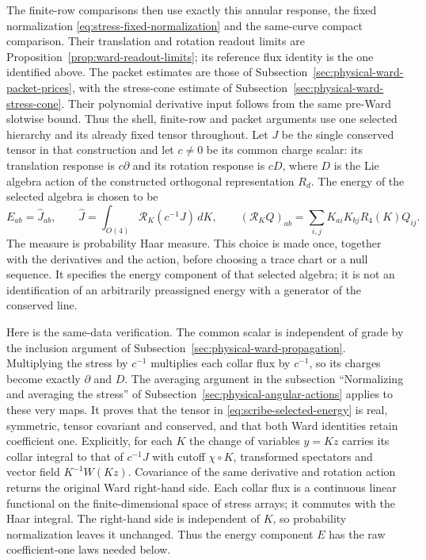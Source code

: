 The finite-row comparisons then use exactly this annular response,
the fixed normalization \eqref{eq:stress-fixed-normalization} and the
same-curve compact comparison. Their translation and rotation readout
limits are Proposition~\ref{prop:ward-readout-limits}; its reference
flux identity is the one identified above. The packet estimates are
those of Subsection~\ref{sec:physical-ward-packet-prices}, with the
stress-cone estimate of Subsection~\ref{sec:physical-ward-stress-cone}.
Their polynomial derivative input follows from the same pre-Ward
slotwise bound. Thus the shell, finite-row and packet arguments use
one selected hierarchy and its already fixed tensor throughout.
Let $J$ be the single conserved tensor in that construction and let
$c\ne0$ be its common charge scalar: its translation response is
$c\partial$ and its rotation response is $cD$, where $D$ is the Lie
algebra action of the constructed orthogonal representation $R_d$.
The energy of the selected algebra is chosen to be
\begin{equation}\label{eq:scribe-selected-energy}
 E_{ab}=\widehat J_{ab},\qquad
 \widehat J=\int_{O(4)}\mathcal R_K(c^{-1}J)\,dK,\qquad
 (\mathcal R_KQ)_{ab}=\sum_{i,j}K_{ai}K_{bj}R_4(K)Q_{ij}.
\end{equation}
The measure is probability Haar measure. This choice is made once,
together with the derivatives and the action, before choosing a trace
chart or a null sequence. It specifies the energy component of that
selected algebra; it is not an identification of an arbitrarily
preassigned energy with a generator of the conserved line.

Here is the same-data verification. The common scalar is independent of
grade by the inclusion argument of
Subsection~\ref{sec:physical-ward-propagation}. Multiplying the stress by
$c^{-1}$ multiplies each collar flux by $c^{-1}$, so its charges become
exactly $\partial$ and $D$. The averaging argument in the subsection
``Normalizing and averaging the stress'' of
Subsection~\ref{sec:physical-angular-actions} applies to these very maps.
It proves that the tensor in \eqref{eq:scribe-selected-energy} is real,
symmetric, tensor covariant and conserved, and that both Ward identities
retain coefficient one. Explicitly, for each $K$ the change of variables
$y=Kz$ carries its collar integral to that of $c^{-1}J$ with cutoff
$\chi\circ K$, transformed spectators and vector field $K^{-1}W(Kz)$.
Covariance of the same derivative and rotation action returns the
original Ward right-hand side. Each collar flux is a continuous linear
functional on the finite-dimensional space of stress arrays; it commutes
with the Haar integral. The right-hand side is independent of $K$, so
probability normalization leaves it unchanged. Thus the energy component
$E$ has the raw coefficient-one laws needed below.

